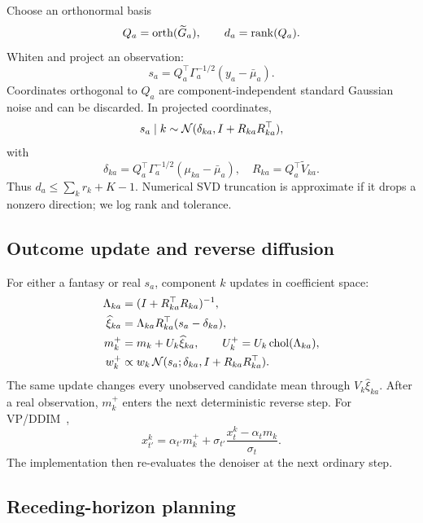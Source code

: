 Choose an orthonormal basis
\begin{equation}
    Q_a=\operatorname{orth}(\widetilde G_a),\qquad
    d_a=\operatorname{rank}(Q_a).
    \label{eq:q}
\end{equation}
Whiten and project an observation:
\begin{equation}
    s_a=Q_a^\top\Gamma_a^{-1/2}(y_a-\bar\mu_a).
    \label{eq:projected-observation}
\end{equation}
Coordinates orthogonal to $Q_a$ are component-independent standard Gaussian
noise and can be discarded.  In projected coordinates,
\begin{equation}
  s_a\mid k\sim\mathcal{N}(\delta_{ka},I+R_{ka}R_{ka}^\top),
\end{equation}
with
\begin{equation}
  \delta_{ka}=Q_a^\top\Gamma_a^{-1/2}(\mu_{ka}-\bar\mu_a),
  \quad R_{ka}=Q_a^\top\widetilde V_{ka}.
\end{equation}
Thus $d_a\leq\sum_kr_k+K-1$.  Numerical SVD truncation is approximate if it
drops a nonzero direction; we log rank and tolerance.

\subsection{Outcome update and reverse diffusion}

For either a fantasy or real $s_a$, component $k$ updates in coefficient
space:
\begin{align}
 \Lambda_{ka}&=(I+R_{ka}^\top R_{ka})^{-1},\\
 \widehat\xi_{ka}
 &=\Lambda_{ka}R_{ka}^\top(s_a-\delta_{ka}),\\
 m_k^+&=m_k+U_k\widehat\xi_{ka},\qquad
 U_k^+=U_k\operatorname{chol}(\Lambda_{ka}), \label{eq:update}\\
 w_k^+&\propto w_k\,
 \mathcal{N}(s_a;\delta_{ka},I+R_{ka}R_{ka}^\top).
\end{align}
The same update changes every unobserved candidate mean through
$V_k\widehat\xi_{ka}$.  After a real observation, $m_k^+$ enters the next
deterministic reverse step.  For VP/DDIM~\cite{song2021ddim},
\begin{equation}
 x_{t'}^k=\alpha_{t'}m_k^+
 +\sigma_{t'}\frac{x_t^k-\alpha_tm_k}{\sigma_t}.
 \label{eq:ddim-update}
\end{equation}
The implementation then re-evaluates the denoiser at the next ordinary step.

\subsection{Receding-horizon planning}

